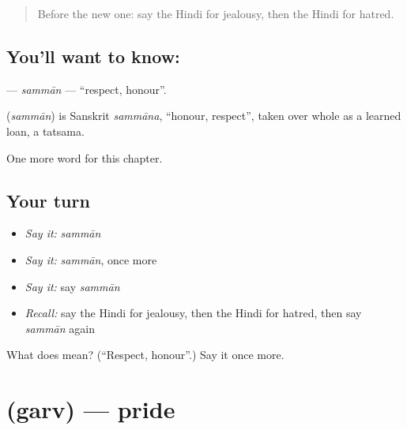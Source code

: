\label{lesson:HI-C257-samman}



\begin{quote}
Before the new one: say the Hindi for jealousy, then the Hindi for hatred.
\end{quote}

\subsection*{You'll want to know: }
\textbf{} — \emph{sammān} — \textquotedblleft{}respect, honour\textquotedblright{}.

\begin{cousinweb}
\textbf{} (\emph{sammān}) is Sanskrit \emph{sammāna}, \textquotedblleft{}honour, respect\textquotedblright{}, taken over whole as a learned loan, a tatsama.
\end{cousinweb}

\begin{grammarlens}[title={What you've built}]
One more word for this chapter.
\end{grammarlens}

\subsection*{Your turn}
\begin{itemize}
\raggedright
  \item \emph{Say it:} \emph{sammān}
  \item \emph{Say it:} \emph{sammān}, once more
  \item \emph{Say it:} say \emph{sammān}
  \item \emph{Recall:} say the Hindi for jealousy, then the Hindi for hatred, then say \emph{sammān} again
\end{itemize}

\begin{tcolorbox}[breakable,colback=teal!4,colframe=teal!35!black,title={Before you move on}]
What does  mean? (\textquotedblleft{}Respect, honour\textquotedblright{}.) Say it once more.
\end{tcolorbox}
\section[\texorpdfstring{\hi{गर्व} (garv)}{गर्व (garv)}]{ (garv) — pride}

\label{lesson:HI-C257-garv}



